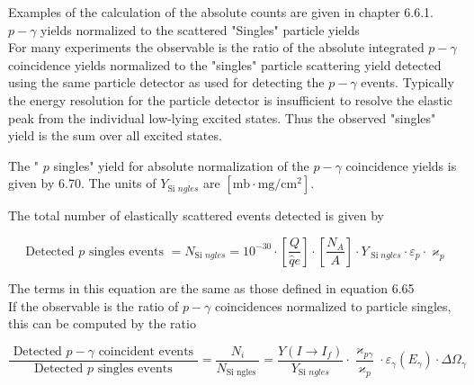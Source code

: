 \documentclass[10pt]{article}
\begin{document}
Examples of the calculation of the absolute counts are given in chapter 6.6.1.\\
$p-\gamma$ yields normalized to the scattered "Singles" particle yields\\
For many experiments the observable is the ratio of the absolute integrated $p-\gamma$ coincidence yields normalized to the "singles" particle scattering yield detected using the same particle detector as used for detecting the $p-\gamma$ events. Typically the energy resolution for the particle detector is insufficient to resolve the elastic peak from the individual low-lying excited states. Thus the observed "singles" yield is the sum over all excited states.

The " $p$ singles" yield for absolute normalization of the $p-\gamma$ coincidence yields is given by 6.70. The units of $Y_{\text {Si } n g l e s}$ are $\left[\mathrm{mb} \cdot \mathrm{mg} / \mathrm{cm}^{2}\right]$.

The total number of elastically scattered events detected is given by


\begin{equation*}
\text { Detected } p \text { singles events }=N_{\text {Si } n g l e s}=10^{-30} \cdot\left[\frac{Q}{\hat{q} e}\right] \cdot\left[\frac{N_{A}}{A}\right] \cdot Y_{\operatorname{Si} n g l e s} \cdot \varepsilon_{p} \cdot \varkappa_{p} \tag{6.70}
\end{equation*}


The terms in this equation are the same as those defined in equation 6.65\\
If the observable is the ratio of $p-\gamma$ coincidences normalized to particle singles, this can be computed by the ratio


\begin{equation*}
\frac{\text { Detected } p-\gamma \text { coincident events }}{\text { Detected } p \text { singles events }}=\frac{N_{i}}{N_{\text {Si ngles }}}=\frac{Y\left(I \rightarrow I_{f}\right)}{Y_{\text {Si } n g l e s}} \cdot \frac{\varkappa_{p \gamma}}{\varkappa_{p}} \cdot \varepsilon_{\gamma}\left(E_{\gamma}\right) \cdot \Delta \Omega_{\gamma} \tag{7.1}
\end{equation*}
\end{document}
